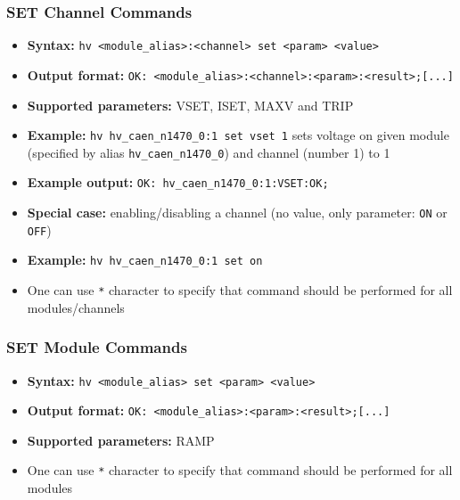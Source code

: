 \dotfill

\subsubsection*{SET Channel Commands}
\begin{itemize}
    \item \textbf{Syntax:} \lstinline{hv <module_alias>:<channel> set <param> <value>}
    \item \textbf{Output format:} \lstinline{OK: <module_alias>:<channel>:<param>:<result>;[...]}
    \item \textbf{Supported parameters:} VSET, ISET, MAXV and TRIP
    \item \textbf{Example:} \lstinline{hv hv_caen_n1470_0:1 set vset 1} sets voltage on given module (specified by alias \lstinline{hv_caen_n1470_0}) and channel (number 1) to 1
    \item \textbf{Example output:} \lstinline{OK: hv_caen_n1470_0:1:VSET:OK;}
    \item \textbf{Special case:} enabling/disabling a channel (no value, only parameter: \lstinline{ON} or \lstinline{OFF})
    \item \textbf{Example:} \lstinline{hv hv_caen_n1470_0:1 set on}
    \item One can use \lstinline{*} character to specify that command should be performed for all modules/channels
\end{itemize}

\dotfill

\subsubsection*{SET Module Commands}
\begin{itemize}
    \item \textbf{Syntax:} \lstinline{hv <module_alias> set <param> <value>}
    \item \textbf{Output format:} \lstinline{OK: <module_alias>:<param>:<result>;[...]}
    \item \textbf{Supported parameters:} RAMP
    \item One can use \lstinline{*} character to specify that command should be performed for all modules
\end{itemize}

\dotfill

